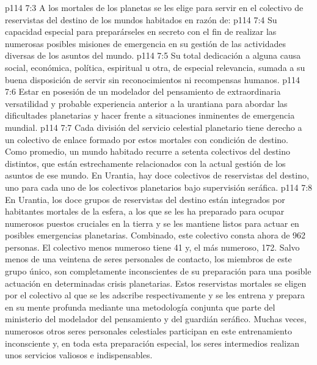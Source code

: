 \vs p114 7:3 A los mortales de los planetas se les elige para servir en el colectivo de reservistas del destino de los mundos habitados en razón de:
\vs p114 7:4 Su capacidad especial para preparárseles en secreto con el fin de realizar las numerosas posibles misiones de emergencia en su gestión de las actividades diversas de los asuntos del mundo.
\vs p114 7:5 Su total dedicación a alguna causa social, económica, política, espiritual u otra, de especial relevancia, sumada a su buena disposición de servir sin reconocimientos ni recompensas humanos.
\vs p114 7:6 Estar en posesión de un modelador del pensamiento de extraordinaria versatilidad y probable experiencia anterior a la urantiana para abordar las dificultades planetarias y hacer frente a situaciones inminentes de emergencia mundial.
\vs p114 7:7 \pc Cada división del servicio celestial planetario tiene derecho a un colectivo de enlace formado por estos mortales con condición de destino. Como promedio, un mundo habitado recurre a setenta colectivos del destino distintos, que están estrechamente relacionados con la actual gestión de los asuntos de ese mundo. En Urantia, hay doce colectivos de reservistas del destino, uno para cada uno de los colectivos planetarios bajo supervisión seráfica.
\vs p114 7:8 En Urantia, los doce grupos de reservistas del destino están integrados por habitantes mortales de la esfera, a los que se les ha preparado para ocupar numerosos puestos cruciales en la tierra y se les mantiene listos para actuar en posibles emergencias planetarias. Combinado, este colectivo consta ahora de 962 personas. El colectivo menos numeroso tiene 41 y, el más numeroso, 172. Salvo menos de una veintena de seres personales de contacto, los miembros de este grupo único, son completamente inconscientes de su preparación para una posible actuación en determinadas crisis planetarias. Estos reservistas mortales se eligen por el colectivo al que se les adscribe respectivamente y se les entrena y prepara en su mente profunda mediante una metodología conjunta que parte del ministerio del modelador del pensamiento y del guardián seráfico. Muchas veces, numerosos otros seres personales celestiales participan en este entrenamiento inconsciente y, en toda esta preparación especial, los seres intermedios realizan unos servicios valiosos e indispensables.

